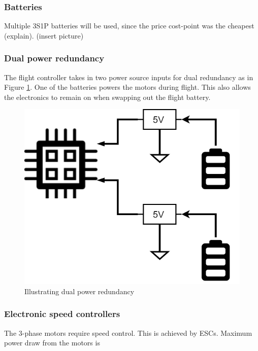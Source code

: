\subsubsection{Batteries}

Multiple 3S1P batteries will be used, since the price cost-point was the cheapest (explain). (insert picture)

\subsubsection{Dual power redundancy}

The flight controller takes in two power source inputs for dual redundancy as in Figure \ref{fig:dual_redundancy}. One of the batteries powers the motors during flight. This also allows the electronics to remain on when swapping out the flight battery.

\begin{figure}[H]
\centering
\includegraphics[scale=0.35]{images/dual_redundancy.png}
\caption{Illustrating dual power redundancy}
\label{fig:dual_redundancy}
\end{figure}

\subsubsection{Electronic speed controllers}

The 3-phase motors require speed control. This is achieved by ESCs. Maximum power draw from the motors is

